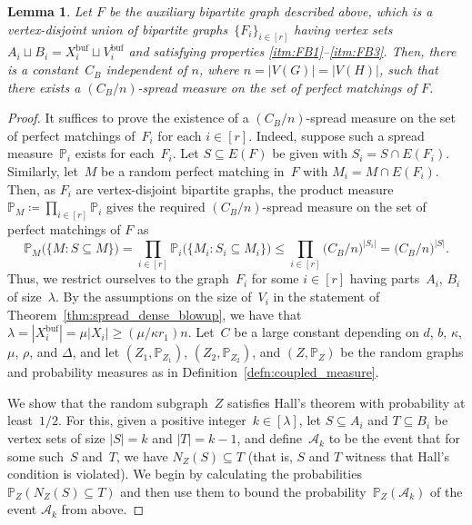 \documentclass[final]{article}
\newtheorem{lemma}[theorem]{Lemma}
\theoremstyle{definition}
\newcommand{\buf}{\mathrm{buf}}
\begin{document}
\begin{lemma}
    \label{lem:buf_spread_measure}
    Let $F$ be the auxiliary bipartite graph described above, which is a vertex-disjoint union of bipartite graphs~$\{F_i\}_{i \in [r]}$ having vertex sets~$A_i \sqcup B_i = X^{\buf}_i \sqcup V^{\buf}_i$ and satisfying properties \ref{itm:FB1}--\ref{itm:FB3}. Then, there is a constant~$C_B$ independent of $n$, where $n = |V(G)| = |V(H)|$, such that there exists a $(C_B/n)$-spread measure on the set of perfect matchings of $F$.    
\end{lemma}
\begin{proof}
    It suffices to prove the existence of a $(C_B/ n)$-spread measure on the set of perfect matchings of~$F_i$ for each $i \in [r]$. Indeed, suppose such a spread measure~$\mathds{P}_i$ exists for each~$F_i$. Let $S \subseteq E(F)$ be given with $S_i = S \cap E(F_i)$. Similarly, let~$M$ be a random perfect matching in~$F$ with $M_i = M \cap E(F_i)$. Then, as $F_i$ are vertex-disjoint bipartite graphs, the product measure $\mathds{P}_M \coloneqq \prod_{i \in [r]} \mathds{P}_i$ gives the required $(C_B/n)$-spread measure on the set of perfect matchings of $F$ as 
    \[\mathds{P}_M\bigl(\{M : S \subseteq M\}\bigr) = \prod_{i \in [r]} \mathds{P}_i\bigl(\{M_i : S_i \subseteq M_i\}\bigr) \leq \prod_{i \in [r]} \bigl( C_B/n \bigr)^{|S_i|} = \bigl( C_B/n\bigr)^{|S|}.\]
    \indent Thus, we restrict ourselves to the graph~$F_i$ for some $i \in [r]$
    having parts~$A_i$, $B_i$ of size~$\lambda$. By the assumptions on the size of~$V_i$ in the statement of Theorem~\ref{thm:spread_dense_blowup}, we have that $\lambda = |X^{\buf}_i| = \mu|X_i| \geq (\mu/\kappa r_1)n$. Let~$C$ be a large constant depending on $d$, $b$, $\kappa$, $\mu$, $\rho$, and $\Delta$, and let $(Z_1, \mathds{P}_{Z_1})$, $(Z_2, \mathds{P}_{Z_2})$, and $(Z, \mathds{P}_Z)$ be the random graphs and probability measures as in Definition~\ref{defn:coupled_measure}. 
    
    We show that the random subgraph~$Z$ satisfies Hall's theorem with probability at least~$1/2$. For this, given a positive integer~$k \in [\lambda]$, let $S \subseteq A_i$ and $T \subseteq B_i$ be vertex sets of size $|S| = k$ and $|T| = k-1$, and define~$\mathcal{A}_k$ to be the event that for some such~$S$ and~$T$, we have $N_Z(S) \subseteq T$ (that is, $S$ and $T$ witness that Hall's condition is violated). We begin by calculating the probabilities $\mathds{P}_Z(N_Z(S) \subseteq T)$ and then use them to bound the probability~$\mathds{P}_Z(\mathcal{A}_k)$ of the event $\mathcal{A}_k$ from above. 


\end{proof}
\end{document}
